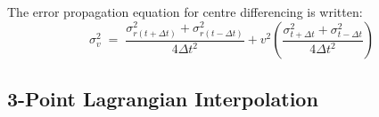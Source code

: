 \documentclass[namedreferences]{SolarPhysics}
\begin{document}
\begin{article}

The error propagation equation for centre differencing is written:
\begin{equation}
\label{eqn_centreerrorprop}
\sigma_v^2 \; = \; \frac{\sigma_{r(t+\Delta t)}^2+\sigma_{r(t-\Delta t)}^2}{4 \Delta t^2} + v^2 \left( \frac{\sigma_{t+\Delta t}^2+\sigma_{t-\Delta t}^2}{4 \Delta t^2} \right) %
\end{equation}


\subsection{3-Point Lagrangian Interpolation}
\label{sect_lagrangian}


\end{article}
\end{document}
